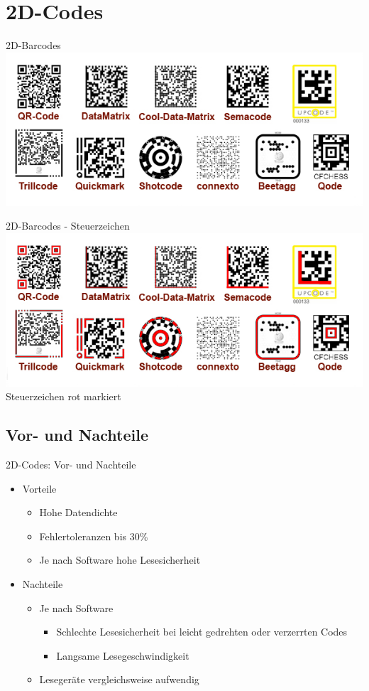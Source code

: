 \section{2D-Codes}

\begin{frame}{2D-Barcodes}
	\includegraphics[width=\textwidth]{muzy/2d-overview-woborder.png}
\end{frame}

\begin{frame}{2D-Barcodes - Steuerzeichen}
	\includegraphics[width=\textwidth]{muzy/2d-overview-controlchars.png}
	\hfill{}Steuerzeichen rot markiert\hfill\hbox{}
\end{frame}

\subsection{Vor- und Nachteile}
\begin{frame}{2D-Codes: Vor- und Nachteile}
	\begin{itemize}
	\item Vorteile
		\begin{itemize}
		\item Hohe Datendichte
		\item Fehlertoleranzen bis 30\%
		\item Je nach Software hohe Lesesicherheit
		\end{itemize}
	\item Nachteile
		\begin{itemize}
		\item Je nach Software
			\begin{itemize}
			\item Schlechte Lesesicherheit bei leicht gedrehten oder verzerrten Codes
			\item Langsame Lesegeschwindigkeit
			\end{itemize}
		\item Lesegeräte vergleichsweise aufwendig
		\end{itemize}
	\end{itemize}
\end{frame}

